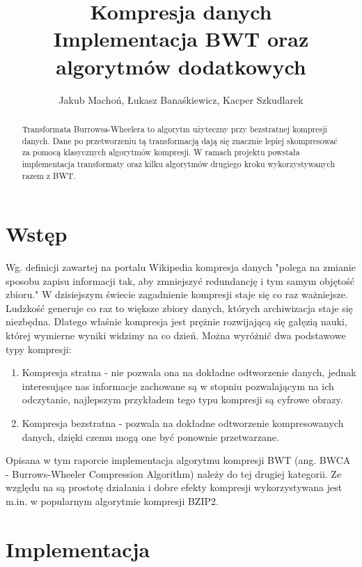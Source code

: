 \documentclass[a4paper,12pt]{article}
\begin{document}
\title{{\small Kompresja danych}\\Implementacja BWT oraz algorytmów dodatkowych}
\author{Jakub Machoń, Łukasz Banaśkiewicz, Kacper Szkudlarek}

\maketitle

\begin{abstract}
Transformata Burrowsa-Wheelera to algorytm użyteczny przy bezstratnej kompresji danych. Dane po przetworzeniu tą transformacją dają się znacznie lepiej skompresować za pomocą klasycznych algorytmów kompresji. W ramach projektu powstała implementacja transformaty oraz kilku algorytmów drugiego kroku wykorzystywanych razem z BWT.
\end{abstract}


\section{Wstęp}
Wg. definicji zawartej na portalu Wikipedia kompresja danych "polega na zmianie sposobu zapisu informacji tak, aby zmniejszyć redundancję i tym samym objętość zbioru." W dzisiejszym świecie zagadnienie kompresji staje się co raz ważniejsze. Ludzkość generuje co raz to większe zbiory danych, których archiwizacja staje się niezbędna. Dlatego właśnie kompresja jest prężnie rozwijającą się gałęzią nauki, której wymierne wyniki widzimy na co dzień. Można wyróżnić dwa podstawowe typy kompresji:
\begin{enumerate}
\item Kompresja stratna - nie pozwala ona na dokładne odtworzenie danych, jednak interesujące nas informacje zachowane są w stopniu pozwalającym na ich odczytanie, najlepszym przykładem tego typu kompresji są cyfrowe obrazy.
\item Kompresja bezstratna - pozwala na dokładne odtworzenie kompresowanych danych, dzięki czemu mogą one być ponownie przetwarzane.
\end{enumerate}
Opisana w tym raporcie implementacja algorytmu kompresji BWT (ang. BWCA - Burrows-Wheeler Compression Algorithm) należy do tej drugiej kategorii. Ze względu na są prostotę działania i dobre efekty kompresji wykorzystywana jest m.in. w popularnym algorytmie kompresji BZIP2.


\section{Implementacja}
\end{document}
